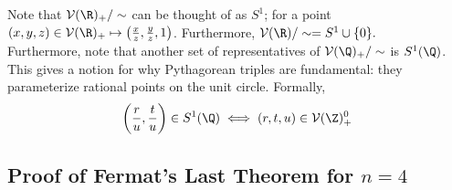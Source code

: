 \documentclass[11pt]{article}
\begin{document}
Note that $\mathcal{V}(\R)_+ / \sim$ can be thought of as $S^1$; for a point
$(x, y, z) \in \mathcal{V} (\R)_+ \mapsto \left( \frac{x}{z}, \frac{y}{z}, 1 \right)$. Furthermore, $\mathcal{V}(\R) / \sim = S^1 \cup \{0\}.$ \\

Furthermore, note that another set of representatives of $\mathcal{V} (\Q)_+ / \sim$ is $S^1(\Q)$. This gives a notion for why Pythagorean triples are fundamental:
they parameterize rational points on the unit circle. Formally, 
\[
    \left( \frac{r}{u}, \frac{t}{u} \right) \in S^1(\Q) \iff (r, t, u) \in \mathcal{V} (\Z)_+^{0} 
\]

\subsection{Proof of Fermat's Last Theorem for $n=4$}
\end{document}
